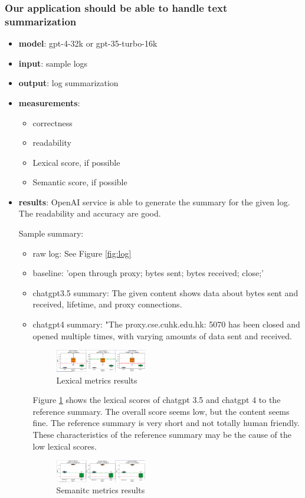 \documentclass[conference]{IEEEtran}
\begin{document}
\subsubsection{Our application should be able to handle text summarization}
\begin{itemize}
    \item \textbf{model}: gpt-4-32k or gpt-35-turbo-16k 
    \item \textbf{input}: sample logs
    \item \textbf{output}: log summarization
    \item \textbf{measurements}:
    \begin{itemize}
        \item correctness
        \item readability
        \item Lexical score, if possible
        \item Semantic score, if possible
    \end{itemize}
    \item \textbf{results}: OpenAI service is able to generate the summary for the given log. The readability and accuracy are good. 

    Sample summary:
    \begin{itemize}
    \item raw log: See Figure \ref{fig:log} 
    \item baseline: 'open through proxy; bytes sent; bytes received; close;'
    \item chatgpt3.5 summary: The given content shows data about bytes sent and received, lifetime, and proxy connections.
    \item chatgpt4 summary: "The proxy.cse.cuhk.edu.hk: 5070 has been closed and opened multiple times, with varying amounts of data sent and received.

    \begin{figure}[ht]
        \centering
        \includegraphics[width=0.4\textwidth]{lexical.png}
        \caption{Lexical metrics results}
        \label{fig:lexical}
    \end{figure} 
    
Figure \ref{fig:lexical} shows the lexical scores of chatgpt 3.5 and chatgpt 4 to the reference summary. The overall score seems low, but the content seems fine. The reference summary is very short and not totally human friendly. These characteristics of the reference summary may be the cause of the low lexical scores.
    \begin{figure}[ht]
        \centering
        \includegraphics[width=0.4\textwidth]{semantic.png}
        \caption{Semanitc metrics results}
        \label{fig:semantic}
    \end{figure} 
    

\end{itemize}
\end{itemize}
\end{document}
